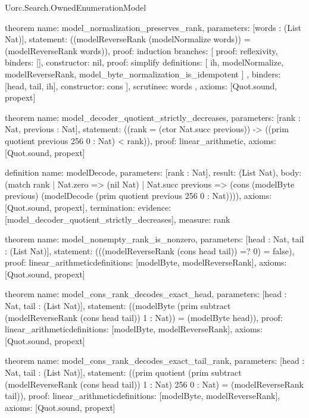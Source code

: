 \begin{lexlean}{Uorc.Search.OwnedEnumerationModel}
\begin{semanticmodule}
theorem{
  name: model_normalization_preserves_rank,
  parameters: [words : (List Nat)],
  statement: ((modelReverseRank (modelNormalize words)) = (modelReverseRank words)),
  proof: induction{
    branches: [
      {proof: reflexivity{}, binders: [], constructor: nil},
      {
        proof: simplify{
          definitions: [
            ih,
            modelNormalize,
            modelReverseRank,
            model_byte_normalization_is_idempotent
          ]
        },
        binders: [head, tail, ih],
        constructor: cons
      }
    ],
    scrutinee: words
  },
  axioms: [Quot.sound, propext]
}

theorem{
  name: model_decoder_quotient_strictly_decreases,
  parameters: [rank : Nat, previous : Nat],
  statement: ((rank = (ctor Nat.succ previous)) -> ((prim quotient previous 256 0 : Nat) < rank)),
  proof: linear_arithmetic{},
  axioms: [Quot.sound, propext]
}

definition{
  name: modelDecode,
  parameters: [rank : Nat],
  result: (List Nat),
  body: (match rank
    | Nat.zero => (nil Nat)
    | Nat.succ previous => (cons (modelByte previous) (modelDecode (prim quotient previous 256 0 : Nat)))),
  axioms: [Quot.sound, propext],
  termination: {evidence: [model_decoder_quotient_strictly_decreases], measure: rank}
}

theorem{
  name: model_nonempty_rank_is_nonzero,
  parameters: [head : Nat, tail : (List Nat)],
  statement: (((modelReverseRank (cons head tail)) =? 0) = false),
  proof: linear_arithmetic{definitions: [modelByte, modelReverseRank]},
  axioms: [Quot.sound, propext]
}

theorem{
  name: model_cons_rank_decodes_exact_head,
  parameters: [head : Nat, tail : (List Nat)],
  statement: ((modelByte (prim subtract (modelReverseRank (cons head tail)) 1 : Nat)) = (modelByte head)),
  proof: linear_arithmetic{definitions: [modelByte, modelReverseRank]},
  axioms: [Quot.sound, propext]
}

theorem{
  name: model_cons_rank_decodes_exact_tail_rank,
  parameters: [head : Nat, tail : (List Nat)],
  statement: ((prim quotient (prim subtract (modelReverseRank (cons head tail)) 1 : Nat) 256 0 : Nat) = (modelReverseRank tail)),
  proof: linear_arithmetic{definitions: [modelByte, modelReverseRank]},
  axioms: [Quot.sound, propext]
}


\end{semanticmodule}
\end{lexlean}
